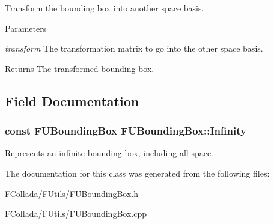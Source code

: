 \label{classFUBoundingBox_ad3ec61464fae8e3f896aa0086b259990}
Transform the bounding box into another space basis. 
\begin{DoxyParams}{Parameters}
\item[{\em transform}]The transformation matrix to go into the other space basis. \end{DoxyParams}
\begin{DoxyReturn}{Returns}
The transformed bounding box. 
\end{DoxyReturn}


\subsection{Field Documentation}
\hypertarget{classFUBoundingBox_a688baae52b9ddfab1fb0082da0bffe57}{
\subsubsection[{Infinity}]{\setlength{\rightskip}{0pt plus 5cm}const {\bf FUBoundingBox} {\bf FUBoundingBox::Infinity}}}
\label{classFUBoundingBox_a688baae52b9ddfab1fb0082da0bffe57}
Represents an infinite bounding box, including all space. 

The documentation for this class was generated from the following files:\begin{DoxyCompactItemize}
\item 
FCollada/FUtils/\hyperlink{FUBoundingBox_8h}{FUBoundingBox.h}\item 
FCollada/FUtils/FUBoundingBox.cpp\end{DoxyCompactItemize}
